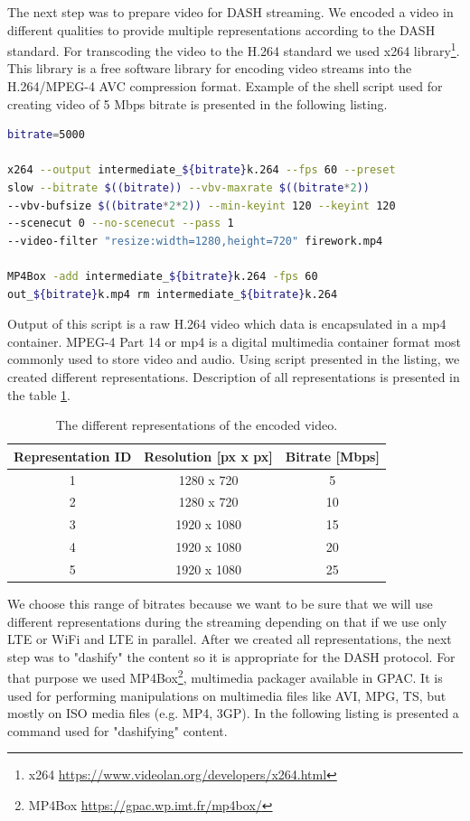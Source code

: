 \documentclass{llncs}
\begin{document}
The next step was to prepare video for DASH streaming. We encoded a video in different qualities to provide multiple representations according to the DASH standard. For transcoding the video to the H.264 standard we used x264 library\footnote{x264 \url{https://www.videolan.org/developers/x264.html}}. This library is a free software library for encoding video streams into the H.264/MPEG-4 AVC compression format. Example of the shell script used for creating video of 5 Mbps bitrate is presented in the following listing.

\begin{lstlisting}[language=bash, caption={\label{l:script}Shell script for encoding the video.}, captionpos=b]
bitrate=5000

x264 --output intermediate_${bitrate}k.264 --fps 60 --preset
slow --bitrate $((bitrate)) --vbv-maxrate $((bitrate*2)) 
--vbv-bufsize $((bitrate*2*2)) --min-keyint 120 --keyint 120 
--scenecut 0 --no-scenecut --pass 1 
--video-filter "resize:width=1280,height=720" firework.mp4

MP4Box -add intermediate_${bitrate}k.264 -fps 60
out_${bitrate}k.mp4 rm intermediate_${bitrate}k.264

\end{lstlisting} 

Output of this script is a raw H.264 video which data is encapsulated in a mp4 container. MPEG-4 Part 14 or mp4 is a digital multimedia container format most commonly used to store video and audio. Using script presented in the listing, we created different representations. Description of all representations is presented in the table \ref{tab:repr}.

\begin{table}
\centering
\begin{tabular}{c|c|c}
Representation ID & Resolution [px x px] & Bitrate [Mbps] \\\hline
1 & 1280 x 720 & 5 \\
2 & 1280 x 720 & 10 \\
3 & 1920 x 1080 & 15 \\
4 & 1920 x 1080 & 20 \\
5 & 1920 x 1080 & 25 \\
\end{tabular}
\caption{\label{tab:repr}The different representations of the encoded video.}
\end{table}

We choose this range of bitrates because we want to be sure that we will use different representations during the streaming depending on that if we use only LTE or WiFi and LTE in parallel. After we created all representations, the next step was to "dashify" the content so it is appropriate for the DASH protocol. For that purpose we used MP4Box\footnote{MP4Box \url{https://gpac.wp.imt.fr/mp4box/}}, multimedia packager available in GPAC. It is used for performing  manipulations on multimedia files like AVI, MPG, TS, but mostly on ISO media files (e.g. MP4, 3GP). In the following listing is presented a command used for "dashifying" content.
\end{document}

